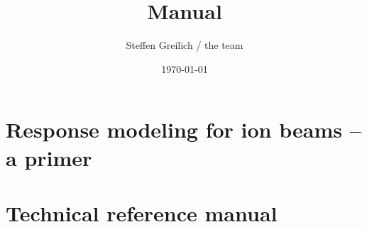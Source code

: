\documentclass[10pt,a4paper]{book}
\title{\la{} Manual}
\author{Steffen Greilich / the \la{} team}
\date{\today}
\begin{document}
\maketitle

\tableofcontents



\part{Response modeling for ion beams -- a primer}

%
%
%

\part{Technical reference manual}











\end{document}
